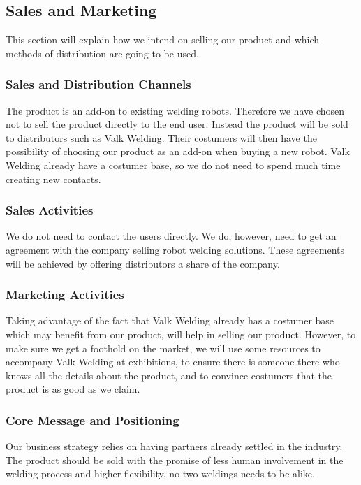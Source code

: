 \subsection{Sales and Marketing}
This section will explain how we intend on selling our product and which methods of distribution are going to be used.
\subsubsection{Sales and Distribution Channels}
The product is an add-on to existing welding robots. Therefore we have chosen not to sell the product directly to the end user. 
Instead the product will be sold to distributors such as Valk Welding. 
Their costumers will then have the possibility of choosing our product as an add-on when buying a new robot.
Valk Welding already have a costumer base, so we do not need to spend much time creating new contacts. 
\subsubsection{Sales Activities}
We do not need to contact the users directly. 
We do, however, need to get an agreement with the company selling robot welding solutions.
These agreements will be achieved by offering distributors a share of the company.
\subsubsection{Marketing Activities}
Taking advantage of the fact that Valk Welding already has a costumer base which may benefit from our product, will help in selling our product.
However, to make sure we get a foothold on the market, we will use some resources to accompany Valk Welding at exhibitions, to ensure there is someone there who knows all the details about the product, and to convince costumers that the product is as good as we claim. 
\subsubsection{Core Message and Positioning}
Our business strategy relies on having partners already settled in the industry.
The product should be sold with the promise of less human involvement in the welding process and higher flexibility, no two weldings needs to be alike.
